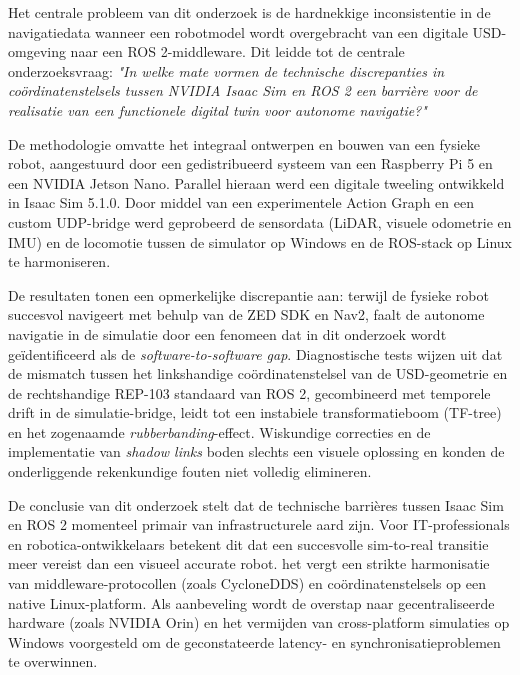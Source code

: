 Het centrale probleem van dit onderzoek is de hardnekkige inconsistentie in de navigatiedata wanneer een robotmodel wordt overgebracht van een digitale USD-omgeving naar een ROS 2-middleware. Dit leidde tot de centrale onderzoeksvraag: \textit{"In welke mate vormen de technische discrepanties in coördinatenstelsels tussen NVIDIA Isaac Sim en ROS 2 een barrière voor de realisatie van een functionele digital twin voor autonome navigatie?"}

De methodologie omvatte het integraal ontwerpen en bouwen van een fysieke robot, aangestuurd door een gedistribueerd systeem van een Raspberry Pi 5 en een NVIDIA Jetson Nano. Parallel hieraan werd een digitale tweeling ontwikkeld in Isaac Sim 5.1.0. Door middel van een experimentele Action Graph en een custom UDP-bridge werd geprobeerd de sensordata (LiDAR, visuele odometrie en IMU) en de locomotie tussen de simulator op Windows en de ROS-stack op Linux te harmoniseren.

De resultaten tonen een opmerkelijke discrepantie aan: terwijl de fysieke robot succesvol navigeert met behulp van de ZED SDK en Nav2, faalt de autonome navigatie in de simulatie door een fenomeen dat in dit onderzoek wordt geïdentificeerd als de \textit{software-to-software gap}. Diagnostische tests wijzen uit dat de mismatch tussen het linkshandige coördinatenstelsel van de USD-geometrie en de rechtshandige REP-103 standaard van ROS 2, gecombineerd met temporele drift in de simulatie-bridge, leidt tot een instabiele transformatieboom (TF-tree) en het zogenaamde \textit{rubberbanding}-effect. Wiskundige correcties en de implementatie van \textit{shadow links} boden slechts een visuele oplossing en konden de onderliggende rekenkundige fouten niet volledig elimineren.

De conclusie van dit onderzoek stelt dat de technische barrières tussen Isaac Sim en ROS 2 momenteel primair van infrastructurele aard zijn. Voor IT-professionals en robotica-ontwikkelaars betekent dit dat een succesvolle sim-to-real transitie meer vereist dan een visueel accurate robot. het vergt een strikte harmonisatie van middleware-protocollen (zoals CycloneDDS) en coördinatenstelsels op een native Linux-platform. Als aanbeveling wordt de overstap naar gecentraliseerde hardware (zoals NVIDIA Orin) en het vermijden van cross-platform simulaties op Windows voorgesteld om de geconstateerde latency- en synchronisatieproblemen te overwinnen.
